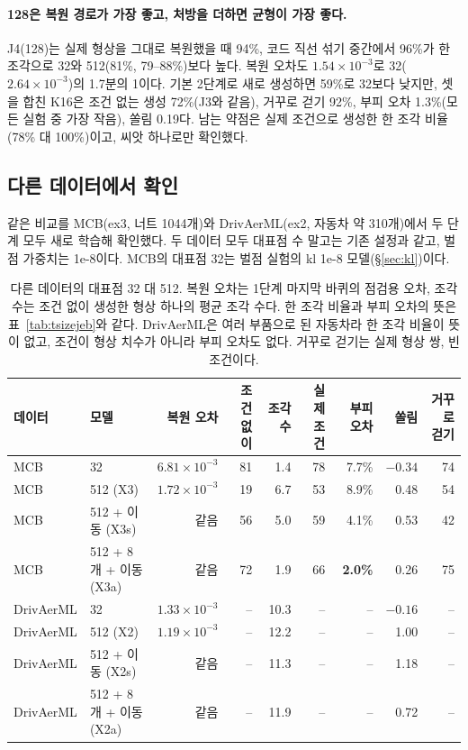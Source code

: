 \documentclass[11pt]{article}
\begin{document}
\paragraph{128은 복원 경로가 가장 좋고, 처방을 더하면 균형이 가장 좋다.} J4(128)는 실제 형상을 그대로 복원했을 때 94\%, 코드 직선 섞기 중간에서 96\%가 한 조각으로
32와 512(81\%, 79--88\%)보다 높다. 복원 오차도 $1.54\times10^{-3}$로 32($2.64\times10^{-3}$)의 1.7분의 1이다. 기본 2단계로 새로 생성하면 59\%로 32보다 낮지만,
셋을 합친 K16은 조건 없는 생성 72\%(J3와 같음), 거꾸로 걷기 92\%, 부피 오차 1.3\%(모든 실험 중 가장 작음), 쏠림 0.19다.
남는 약점은 실제 조건으로 생성한 한 조각 비율(78\% 대 100\%)이고, 씨앗 하나로만 확인했다.

\subsection{다른 데이터에서 확인}

같은 비교를 MCB(ex3, 너트 1044개)와 DrivAerML(ex2, 자동차 약 310개)에서 두 단계 모두 새로 학습해 확인했다.
두 데이터 모두 대표점 수 말고는 기존 설정과 같고, 벌점 가중치는 1e-8이다. MCB의 대표점 32는 벌점 실험의 kl 1e-8 모델(\S\ref{sec:kl})이다.

\begin{table}[htbp]
\centering\footnotesize\setlength{\tabcolsep}{3.2pt}
\begin{tabular}{l l r r r r r r r}
\toprule
데이터 & 모델 & 복원 오차 & 조건 없이 & 조각 수 & 실제 조건 & 부피 오차 & 쏠림 & 거꾸로 걷기 \\
\midrule
MCB & 32 & $6.81\times10^{-3}$ & 81 & 1.4 & 78 & 7.7\% & $-0.34$ & 74 \\
MCB & 512 (X3) & $1.72\times10^{-3}$ & 19 & 6.7 & 53 & 8.9\% & 0.48 & 54 \\
MCB & 512 + 이동 (X3s) & 같음 & 56 & 5.0 & 59 & 4.1\% & 0.53 & 42 \\
MCB & 512 + 8개 + 이동 (X3a) & 같음 & 72 & 1.9 & 66 & \textbf{2.0\%} & 0.26 & 75 \\
\midrule
DrivAerML & 32 & $1.33\times10^{-3}$ & -- & 10.3 & -- & -- & $-0.16$ & -- \\
DrivAerML & 512 (X2) & $1.19\times10^{-3}$ & -- & 12.2 & -- & -- & 1.00 & -- \\
DrivAerML & 512 + 이동 (X2s) & 같음 & -- & 11.3 & -- & -- & 1.18 & -- \\
DrivAerML & 512 + 8개 + 이동 (X2a) & 같음 & -- & 11.9 & -- & -- & 0.72 & -- \\
\bottomrule
\end{tabular}
\caption{다른 데이터의 대표점 32 대 512. 복원 오차는 1단계 마지막 바퀴의 점검용 오차, 조각 수는 조건 없이 생성한 형상 하나의 평균 조각 수다.
한 조각 비율과 부피 오차의 뜻은 표~\ref{tab:tsizejeb}와 같다. DrivAerML은 여러 부품으로 된 자동차라 한 조각 비율이 뜻이 없고,
조건이 형상 치수가 아니라 부피 오차도 없다. 거꾸로 걷기는 실제 형상 쌍, 빈 조건이다.}
\label{tab:tsizeother}
\end{table}
\end{document}
